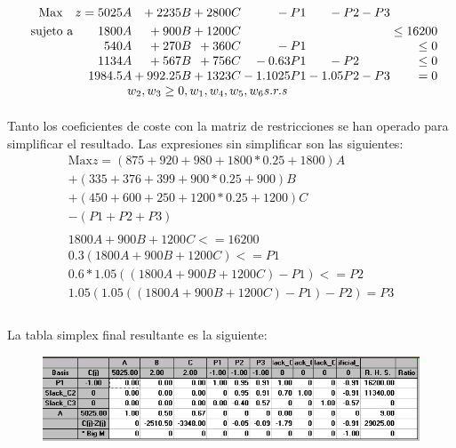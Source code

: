 \documentclass[10pt, a4paper]{article}
\begin{document}
			\[
			  \begin{array}{r@{}r@{}r@{}r@{}r@{}r@{}r@{}l}
			    \text{Max} \quad z = 	5025A	&{} + 2235B		&{} + 2800C 	&{}	-P1 	&{} -P2		&{} -P3 	&{}\\[\jot]
			    \text{sujeto a}\qquad 	1800A 	&{} + 900B		&{} + 1200C	&{} 		&{}			&{}			&{}	\leq 16200 \\
			                     		540A 	&{} + 270B		&{} + 360C	&{}	-P1		&{}			&{}			&{}	\leq 0 \\
								 		1134A 	&{} + 567B		&{} + 756C	&{}	-0.63P1	&{}	-P2		&{} 		&{}	\leq 0 \\
								 		1984.5A &{} + 992.25B	&{} + 1323C	&{}-1.1025P1&{}	-1.05P2	&{}  -P3	&{}	= 0  \\
			     \multicolumn{6}{c}{ w_{2}, w_{3} \geq 0, w_{1}, w_{4}, w_{5}, w_{6} s.r.s}


			  \end{array}
			\]

			\paragraph{}
			Tanto los coeficientes de coste con la matriz de restricciones se han operado para simplificar el resultado. Las expresiones sin simplificar son las siguientes:
			\[
				\begin{split}
					\text{Max} z = (875 + 920 + 980 + 1800 * 0.25 + 1800)A \\
					+ (335 + 376 + 399 + 900 * 0.25 + 900)B \\
					+(450 + 600 + 250 + 1200 * 0.25 + 1200)C \\
					-(P1 + P2 + P3) \\ \\
					1800A + 900B + 1200C <= 16200 \\
					0.3(1800A + 900B + 1200C) <= P1 \\
					0.6*1.05((1800A + 900B + 1200C)-P1) <= P2 \\
					1.05(1.05((1800A + 900B + 1200C)-P1)-P2) = P3\\
				\end{split}
			\]

			\paragraph{}
			La tabla simplex final resultante es la siguiente:

			\begin{figure}[H]
			\centering
				\includegraphics[width=\textwidth]{res/Exercise_2_pp_simplex_final.png}
			\end{figure}
\end{document}
